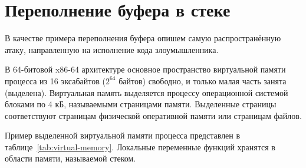 \section{Переполнение буфера в стеке}

В качестве примера переполнения буфера опишем самую распространённую атаку, направленную на исполнение кода злоумышленника.

В 64-битовой x86-64 архитектуре основное пространство виртуальной памяти процесса из 16 эксабайтов ($2^{64}$ байтов) свободно, и только малая часть занята (выделена). Виртуальная память выделяется процессу операционной системой блоками по 4 кБ, называемыми страницами памяти. Выделенные страницы соответствуют страницам физической оперативной памяти или страницам файлов.

Пример выделенной виртуальной памяти процесса представлен в таблице~\ref{tab:virtual-memory}. Локальные переменные функций хранятся в области памяти, называемой стеком.
\begin{table}[!ht]
    \centering
    \caption{Пример структуры виртуальной памяти процесса\label{tab:virtual-memory}}
\end{table}

